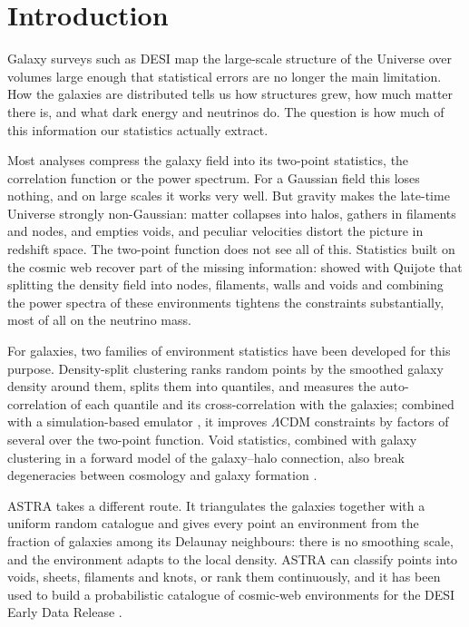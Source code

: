 \section{Introduction}

Galaxy surveys such as DESI map the large-scale structure of the Universe over volumes large enough that statistical errors are no longer the main limitation. How the galaxies are distributed tells us how structures grew, how much matter there is, and what dark energy and neutrinos do. The question is how much of this information our statistics actually extract.

Most analyses compress the galaxy field into its two-point statistics, the correlation function or the power spectrum. For a Gaussian field this loses nothing, and on large scales it works very well. But gravity makes the late-time Universe strongly non-Gaussian: matter collapses into halos, gathers in filaments and nodes, and empties voids, and peculiar velocities distort the picture in redshift space. The two-point function does not see all of this. Statistics built on the cosmic web recover part of the missing information: \cite{Sunseri} showed with Quijote that splitting the density field into nodes, filaments, walls and voids and combining the power spectra of these environments tightens the constraints substantially, most of all on the neutrino mass.

For galaxies, two families of environment statistics have been developed for this purpose. Density-split clustering \cite{Paillas2023, Paillas2024} ranks random points by the smoothed galaxy density around them, splits them into quantiles, and measures the auto-correlation of each quantile and its cross-correlation with the galaxies; combined with a simulation-based emulator \cite{CuestaLazaro2024}, it improves $\Lambda$CDM constraints by factors of several over the two-point function. Void statistics, combined with galaxy clustering in a forward model of the galaxy--halo connection, also break degeneracies between cosmology and galaxy formation \cite{Salcedo}.

ASTRA \cite{ASTRA} takes a different route. It triangulates the galaxies together with a uniform random catalogue and gives every point an environment from the fraction of galaxies among its Delaunay neighbours: there is no smoothing scale, and the environment adapts to the local density. ASTRA can classify points into voids, sheets, filaments and knots, or rank them continuously, and it has been used to build a probabilistic catalogue of cosmic-web environments for the DESI Early Data Release \cite{ZapataZuluaga2026}.

